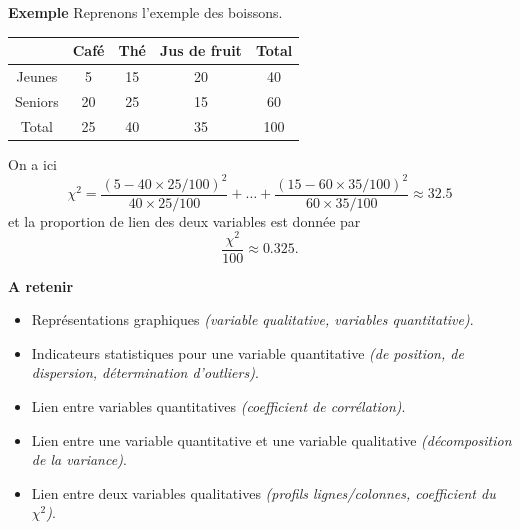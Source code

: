 \documentclass[aspectratio=169,xcolor=dvipsnames]{beamer}
\begin{document}
\begin{frame}
	\begin{exampleblock}{\textbf{Exemple}}
	Reprenons l'exemple des boissons.
		\begin{scriptsize}
		\begin{center}
		\begin{tabular}{|c|c|c|c|c|}
		\hline
		\diagbox[height=0.5cm]{$x$ \ }{$y$} & Café & Thé & Jus de fruit & Total \\ \hline
		Jeunes & 5 & 15 & 20 & 40 \\ \hline
		Seniors & 20 & 25 & 15 & 60 \\ \hline
		Total & 25 & 40 & 35 & 100\\ \hline
		\end{tabular}
		\end{center}
		\end{scriptsize}
		
		On a ici
			\[
			\chi^2 = \dfrac{\left(5 - 40\times 25/100\right)^2}{40\times 25/100}+\dots + \dfrac{\left(15-60\times 35/100 \right)^2}{60\times 35/100} \approx 32.5
			\]
		et la proportion de lien des deux variables est donnée par
			\[
			\dfrac{\chi^2}{100} \approx 0.325.
			\]
	\end{exampleblock}
\end{frame}

\begin{frame}
	\begin{block}{\textbf{A retenir}}
		\begin{itemize}
		\item Représentations graphiques \emph{(variable qualitative, variables quantitative)}.
		\item Indicateurs statistiques pour une variable quantitative \emph{(de position, de dispersion, détermination d'outliers)}.
		\item Lien entre variables quantitatives \emph{(coefficient de corrélation)}.
		\item Lien entre une variable quantitative et une variable qualitative \emph{(décomposition de la variance)}.
		\item Lien entre deux variables qualitatives \emph{(profils lignes/colonnes, coefficient du $\chi^2$)}.
		\end{itemize}
	\end{block}
\end{frame}
\end{document}
